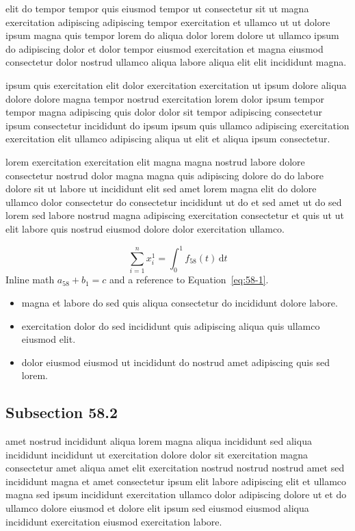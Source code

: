 \documentclass{article}
\begin{document}
elit do tempor tempor quis eiusmod tempor ut consectetur sit ut magna exercitation adipiscing adipiscing tempor exercitation et ullamco ut ut dolore ipsum magna quis tempor lorem do aliqua dolor lorem dolore ut ullamco ipsum do adipiscing dolor et dolor tempor eiusmod exercitation et magna eiusmod consectetur dolor nostrud ullamco aliqua labore aliqua elit elit incididunt magna.

ipsum quis exercitation elit dolor exercitation exercitation ut ipsum dolore aliqua dolore dolore magna tempor nostrud exercitation lorem dolor ipsum tempor tempor magna adipiscing quis dolor dolor sit tempor adipiscing consectetur ipsum consectetur incididunt do ipsum ipsum quis ullamco adipiscing exercitation exercitation elit ullamco adipiscing aliqua ut elit et aliqua ipsum consectetur.

lorem exercitation exercitation elit magna magna nostrud labore dolore consectetur nostrud dolor magna magna quis adipiscing dolore do do labore dolore sit ut labore ut incididunt elit sed amet lorem magna elit do dolore ullamco dolor consectetur do consectetur incididunt ut do et sed amet ut do sed lorem sed labore nostrud magna adipiscing exercitation consectetur et quis ut ut elit labore quis nostrud eiusmod dolore dolor exercitation ullamco.

\begin{equation}\label{eq:58-1}
  \sum_{i=1}^{n} x_i^{1} = \int_0^1 f_{58}(t)\,\mathrm{d}t
\end{equation}
Inline math $a_{58} + b_{1} = c$ and a reference to Equation~\eqref{eq:58-1}.

\begin{itemize}
  \item magna et labore do sed quis aliqua consectetur do incididunt dolore labore.
  \item exercitation dolor do sed incididunt quis adipiscing aliqua quis ullamco eiusmod elit.
  \item dolor eiusmod eiusmod ut incididunt do nostrud amet adipiscing quis sed lorem.
\end{itemize}

\subsection{Subsection 58.2}\label{sec:58-2}
amet nostrud incididunt aliqua lorem magna aliqua incididunt sed aliqua incididunt incididunt ut exercitation dolore dolor sit exercitation magna consectetur amet aliqua amet elit exercitation nostrud nostrud nostrud amet sed incididunt magna et amet consectetur ipsum elit labore adipiscing elit et ullamco magna sed ipsum incididunt exercitation ullamco dolor adipiscing dolore ut et do ullamco dolore eiusmod et dolore elit ipsum sed eiusmod eiusmod aliqua incididunt exercitation eiusmod exercitation labore.
\end{document}
